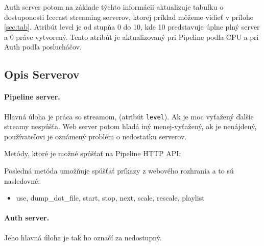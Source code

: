 \documentclass[11pt]{article}
\newif\ifknowhow
\newcommand{\ommited}{ VYNECHANÉ }
\begin{document}
Auth server potom na základe týchto informácii aktualizuje tabuľku o dostuponosti Icecast streaming serverov, ktorej príklad môžeme vidieť v prílohe \ref{sec:tab}. Atribút level je od stupňa 0 do 10, kde 10 predstavuje úplne plný server a 0 práve vytvorený. Tento atribút je aktualizovaný pri Pipeline podľa CPU a pri Auth podľa poslucháčov.

\subsection{Opis Serverov  \label{os}}

\paragraph{Pipeline server.} Hlavná úloha je práca so streamom, \ifknowhow teda dekódovanie, mixovanie, enkódovania a pripájanie nových Icecast streaming serverov. Tento server si sám aktualizuje tabuľku o vyťaženosti \else\ommited{}\fi (atribút \texttt{level}). Ak je moc vyťažený ďalšie streamy nespúšťa. Web server potom hľadá iný menej-vyťažený, ak je nenájdený, používateľovi je oznámený problém o nedostatku serverov. 

Metódy, ktoré je možné spúšťať na Pipeline HTTP API:

\ifknowhow
\begin{code}
(r"/live.json", LiveHandler),
(r"/updates.json", UpdatesHandler),
(r"/start-streaming.json", StartStreamHandler),
(r"/restart.json", RestartStreamHandler),
(r"/scale.json", ScaleHandler),
(r"/is-alive.json", IsAliveHandler),
(r"/playlist-update.json", PlaylistUpdateHandler),
(r"/run-command.json", RunCommandHandler)
\end{code}
\else\ommited{}\fi

Posledná metóda umožňuje spúšťať príkazy z webového rozhrania a to sú nasledovné:

\begin{itemize}[noitemsep]
\item use, dump\_dot\_file, start, stop, next, scale, rescale, playlist
\end{itemize}

\paragraph{Auth server.} Jeho hlavná úloha je \ifknowhow autentifikácia poslucháčov. Icecast streaming server sa pýta priamo tohto servera cez HTTP API, či poslucháčovi pustiť stream alebo nie. Aktualizuje tabuľku o Icecast streaming serveroch a ak Pipeline prestane posielať stream, opýta sa ho, či je dostupný, ak nie je, \else\ommited{}\fi tak ho označí za nedostupný. 
\end{document}
